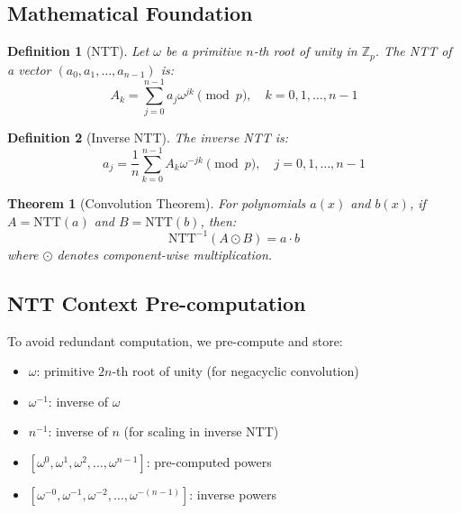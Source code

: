 \documentclass[11pt,a4paper]{article}
\newtheorem{definition}{Definition}
\newtheorem{theorem}{Theorem}
\newcommand{\Z}{\mathbb{Z}}
\begin{document}
\subsection{Mathematical Foundation}

\begin{definition}[NTT]
Let $\omega$ be a primitive $n$-th root of unity in $\Z_p$. The NTT of a vector $(a_0, a_1, \ldots, a_{n-1})$ is:
\[
A_k = \sum_{j=0}^{n-1} a_j \omega^{jk} \pmod{p}, \quad k = 0, 1, \ldots, n-1
\]
\end{definition}

\begin{definition}[Inverse NTT]
The inverse NTT is:
\[
a_j = \frac{1}{n} \sum_{k=0}^{n-1} A_k \omega^{-jk} \pmod{p}, \quad j = 0, 1, \ldots, n-1
\]
\end{definition}

\begin{theorem}[Convolution Theorem]
For polynomials $a(x)$ and $b(x)$, if $A = \text{NTT}(a)$ and $B = \text{NTT}(b)$, then:
\[
\text{NTT}^{-1}(A \odot B) = a \cdot b
\]
where $\odot$ denotes component-wise multiplication.
\end{theorem}

\subsection{NTT Context Pre-computation}

To avoid redundant computation, we pre-compute and store:
\begin{itemize}
    \item $\omega$: primitive $2n$-th root of unity (for negacyclic convolution)
    \item $\omega^{-1}$: inverse of $\omega$
    \item $n^{-1}$: inverse of $n$ (for scaling in inverse NTT)
    \item $[\omega^0, \omega^1, \omega^2, \ldots, \omega^{n-1}]$: pre-computed powers
    \item $[\omega^{-0}, \omega^{-1}, \omega^{-2}, \ldots, \omega^{-(n-1)}]$: inverse powers
\end{itemize}

\end{document}
